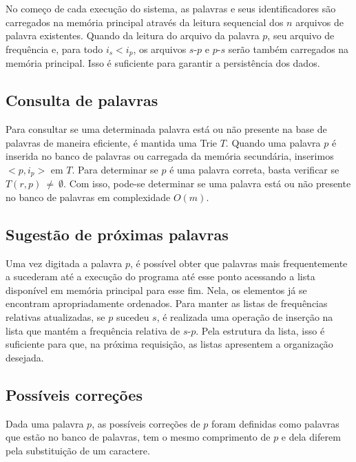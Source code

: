 \documentclass[12pt]{article}
\begin{document}
    No começo de cada execução do sistema, as palavras e seus identificadores são carregados na memória principal através da leitura sequencial dos $n$ arquivos de palavra existentes.
    Quando da leitura do arquivo da palavra $p$, seu arquivo de frequência e, para todo $i_s < i_p$, os arquivos $s$-$p$ e $p$-$s$ serão também carregados na memória principal.
    Isso é suficiente para garantir a persistência dos dados.

    \subsection{Consulta de palavras}
    Para consultar se uma determinada palavra está ou não presente na base de palavras de maneira eficiente, é mantida uma Trie $T$.
    Quando uma palavra $p$ é inserida no banco de palavras ou carregada da memória secundária, inserimos $<p, i_p>$ em $T$.
    Para determinar se $p$ é uma palavra correta, basta verificar se $T(r, p)~\ne~\emptyset$.
    Com isso, pode-se determinar se uma palavra está ou não presente no banco de palavras em complexidade $O(m)$.

    \subsection{Sugestão de próximas palavras}
    Uma vez digitada a palavra $p$, é possível obter que palavras mais frequentemente a sucederam até a execução do programa até esse ponto acessando a lista disponível em memória principal para esse fim.
    Nela, os elementos já se encontram apropriadamente ordenados.
    Para manter as listas de frequências relativas atualizadas, se $p$ sucedeu $s$, é realizada uma operação de inserção na lista que mantém a frequência relativa de $s$-$p$.
    Pela estrutura da lista, isso é suficiente para que, na próxima requisição, as listas apresentem a organização desejada.

    \subsection{Possíveis correções}
    Dada uma palavra $p$, as possíveis correções de $p$ foram definidas como palavras que estão no banco de palavras, tem o mesmo comprimento de $p$ e dela diferem pela substituição de um caractere.
\end{document}
